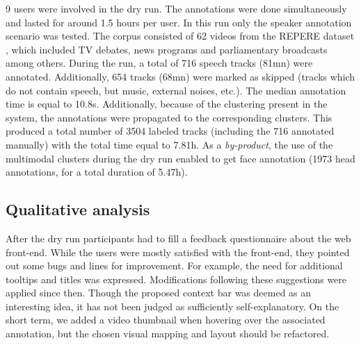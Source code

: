 \documentclass[a4paper]{article}
\begin{document}
9 users were involved in the dry run. The annotations were done simultaneously and lasted for around 1.5 hours per user.
In this run only the speaker annotation scenario was tested. The corpus consisted of 62 videos from the REPERE dataset \cite{giraudel2012repere}, which included TV debates, news programs and parliamentary broadcasts among others.  During the run, a total of 716 speech tracks (81mn) were annotated. Additionally, 654 tracks (68mn) were marked as skipped (tracks which do not contain speech, but music, external noises, etc.). The median annotation time is equal to 10.8s. Additionally, because of the clustering present in the system, the annotations were propagated to the corresponding clusters. This produced a total number of 3504 labeled tracks (including the 716 annotated manually) with the total time equal to 7.81h. As a \textit{by-product}, the use of the multimodal clusters during the dry run enabled to get face annotation (1973 head annotations, for a total duration of 5.47h). 





 
    

  
        \vspace{-0.2cm}
     \subsection{Qualitative analysis}
        \vspace{-0.1cm}    


After the dry run participants had to fill a feedback questionnaire about the web front-end. 
While the users were mostly satisfied with the front-end, they pointed out some bugs and lines for improvement. For example, the need for additional tooltips and titles was expressed. Modifications following these suggestions were applied since then. Though the proposed context bar was deemed as an interesting idea, it has not been judged as sufficiently self-explanatory. On the short term, we added a video thumbnail when hovering over the associated annotation, but the chosen visual mapping and layout should be refactored. 
\end{document}
